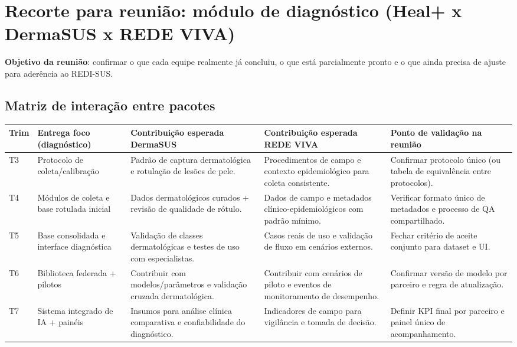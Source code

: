 \documentclass[
    12pt,
    openright,
    oneside,
    a4paper,
    chapter=TITLE,
    section=TITLE,
    brazil,
    sumario=tradicional,
    hidelinks
]{abntex2}
\begin{document}
\section{Recorte para reunião: módulo de diagnóstico (Heal+ x DermaSUS x REDE VIVA)}
\textbf{Objetivo da reunião}: confirmar o que cada equipe realmente já concluiu, o que está parcialmente pronto e o que ainda precisa de ajuste para aderência ao REDI-SUS.

\subsection{Matriz de interação entre pacotes}
{\footnotesize
\renewcommand{\arraystretch}{1.25}
\setlength{\tabcolsep}{3pt}
\begin{longtable}{L{0.9cm}L{2.7cm}L{3.3cm}L{3.3cm}L{2.8cm}}
\toprule
\textbf{Trim} & \textbf{Entrega foco (diagnóstico)} & \textbf{Contribuição esperada DermaSUS} & \textbf{Contribuição esperada REDE VIVA} & \textbf{Ponto de validação na reunião} \\
\midrule
\endhead

T3 & Protocolo de coleta/calibração & Padrão de captura dermatológica e rotulação de lesões de pele. & Procedimentos de campo e contexto epidemiológico para coleta consistente. & Confirmar protocolo único (ou tabela de equivalência entre protocolos). \\

T4 & Módulos de coleta e base rotulada inicial & Dados dermatológicos curados + revisão de qualidade de rótulo. & Dados de campo e metadados clínico-epidemiológicos com padrão mínimo. & Verificar formato único de metadados e processo de QA compartilhado. \\

T5 & Base consolidada e interface diagnóstica & Validação de classes dermatológicas e testes de uso com especialistas. & Casos reais de uso e validação de fluxo em cenários externos. & Fechar critério de aceite conjunto para dataset e UI. \\

T6 & Biblioteca federada + pilotos & Contribuir com modelos/parâmetros e validação cruzada dermatológica. & Contribuir com cenários de piloto e eventos de monitoramento de desempenho. & Confirmar versão de modelo por parceiro e regra de atualização. \\

T7 & Sistema integrado de IA + painéis & Insumos para análise clínica comparativa e confiabilidade do diagnóstico. & Indicadores de campo para vigilância e tomada de decisão. & Definir KPI final por parceiro e painel único de acompanhamento. \\
\bottomrule
\end{longtable}
}
\end{document}

